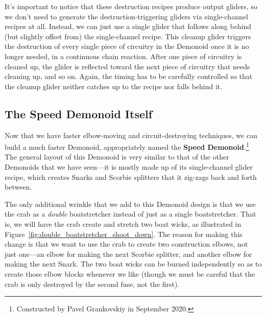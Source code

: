 It's important to notice that these destruction recipes produce output gliders, so we don't need to generate the destruction-triggering gliders via single-channel recipes at all. Instead, we can just use a single glider that follows along behind (but slightly offset from) the single-channel recipe. This cleanup glider triggers the destruction of every single piece of circuitry in the Demonoid once it is no longer needed, in a continuous chain reaction. After one piece of circuitry is cleaned up, the glider is reflected toward the next piece of circuitry that needs cleaning up, and so on. Again, the timing has to be carefully controlled so that the cleanup glider neither catches up to the recipe nor falls behind it.



\subsection{The Speed Demonoid Itself}\label{sec:speed_demonoid}

Now that we have faster elbow-moving and circuit-destroying techniques, we can build a much faster Demonoid, appropriately named the \textbf{Speed Demonoid}.\footnote{Constructed by Pavel Grankovskiy in September 2020.} The general layout of this Demonoid is very similar to that of the other Demonoids that we have seen---it is mostly made up of its single-channel glider recipe, which creates Snarks and Scorbie splitters that it zig-zags back and forth between.

The only additional wrinkle that we add to this Demonoid design is that we use the crab as a \emph{double} boatstretcher instead of just as a single boatstretcher. That is, we will have the crab create and stretch two boat wicks, as illustrated in Figure~\ref{fig:double_boatstretcher_shoot_down}. The reason for making this change is that we want to use the crab to create two construction elbows, not just one---an elbow for making the next Scorbie splitter, and another elbow for making the next Snark. The two boat wicks can be burned independently so as to create those elbow blocks whenever we like (though we must be careful that the crab is only destroyed by the second fuse, not the first).

